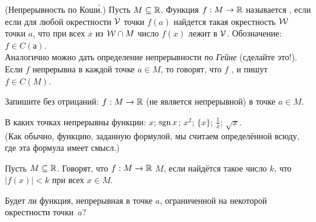 \documentclass[a4paper,12pt]{article}
\begin{document}




{\small\sc (Непрерывность по Кош\'и.)}
Пусть $M \subseteq\mathbb{R}$. Функция $f:M\rightarrow\mathbb{R}$
называется , если
если для любой окрестности ${\cal V}$ точки $f(a)$
найдется такая окрестность ${\cal W}$ точки $a$, что при всех $x$ из ${\cal W}\cap M$
число $f(x)$ лежит в $\cal V$. Обозначение: $f\in C(а)$.\\
Аналогично можно дать определение непрерывности {\it по Гейне} (сделайте это!).\\
Если $f$ непрерывна в каждой точке $a\in M$, то говорят, что $f$ , и пишут
\hbox{$f\in C(M)$.}

 Запишите без отрицаний:  $f:M \rightarrow \mathbb{R}$
 (не является непрерывной) в точке $a\in M$.

 В каких точках непрерывны %
функции:
   $x$;
   $\mathop{\mbox{\rm sgn}}x$;
   $x^2$;
   $\{x\}$;
   $\frac 1x$;
   $\sqrt x$.\\
{\small (Как обычно, функцию, заданную формулой, мы считаем определ\"енной
всюду, где эта формула имеет смысл.)}


Пусть $M\subseteq\mathbb{R}$.
Говорят, что $f:M\rightarrow\mathbb{R}$ 
$M$, если найд\"ется такое число $k$, что $|f(x)|<k$ при всех $x\in M$.

 Будет ли функция, непрерывная в точке $a$, ограниченной
на некоторой окрестности точки~$a$?
\end{document}
